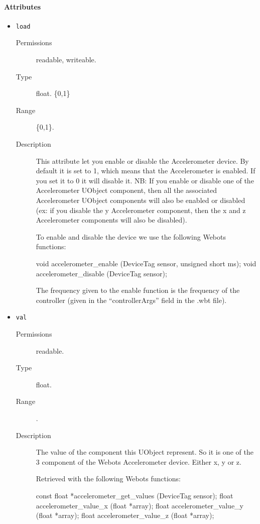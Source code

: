 \paragraph{Attributes}

\newenvironment{attribute}[4]
{
  \item \lstinline|#1|\\
    \begin{description}
    \item[Permissions] #2.
    \item[Type] #3.
      \ifx#4\empty\else
    \item[Range] #4.
      \fi
    \item[Description]
}{
    \end{description}
}

\noindent
\begin{itemize}
\begin{attribute}{load}
  {readable, writeable}
  {float}
  {\{0,1\}}

    This attribute let you enable or disable the
    Accelerometer device.  By default it is set to 1, which means that
    the Accelerometer is enabled. If you set it to 0 it will disable
    it. NB: If you enable or disable one of the Accelerometer UObject
    component, then all the associated Accelerometer UObject components
    will also be enabled or disabled (ex: if you disable the y
    Accelerometer component, then the x and z Accelerometer components
    will also be disabled).


    To enable and disable the device we use the following Webots
    functions:

\begin{cxx}
void accelerometer_enable (DeviceTag sensor, unsigned short ms);
void accelerometer_disable (DeviceTag sensor);
\end{cxx}

    The frequency given to the enable function is the frequency of the
    \urbi controller (given in the ``controllerArgs'' field in the .wbt
    file).
\end{attribute}

\begin{attribute}{val}
  {readable}
  {float}
  {}
  The value of the component this UObject represent. So
  it is one of the 3 component of the Webots Accelerometer
  device. Either x, y or z.


  Retrieved with the following Webots functions:


\begin{cxx}
const float *accelerometer_get_values (DeviceTag sensor);
float accelerometer_value_x (float *array);
float accelerometer_value_y (float *array);
float accelerometer_value_z (float *array);
\end{cxx}
\end{attribute}

\end{itemize}

